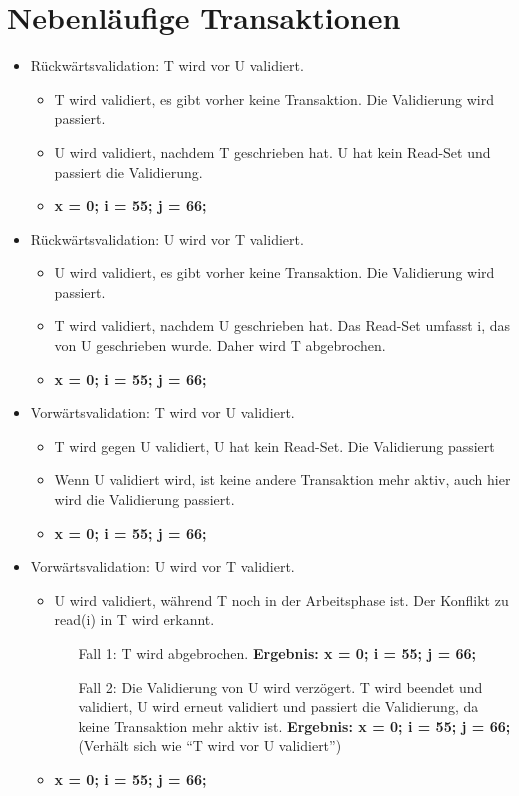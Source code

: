 \documentclass[a4paper,9pt]{article}
\begin{document}
\section{Nebenl\"aufige Transaktionen}

\begin{itemize}
\item R\"uckw\"artsvalidation: T wird vor U validiert.
	\begin{itemize}
	\item T wird validiert, es gibt vorher keine Transaktion. Die Validierung wird passiert.
	\item U wird validiert, nachdem T geschrieben hat. U hat kein Read-Set und passiert die Validierung.
	\item \textbf{x = 0; i = 55; j = 66;}
	\end{itemize}
\item R\"uckw\"artsvalidation: U wird vor T validiert.
	\begin{itemize}
	\item U wird validiert, es gibt vorher keine Transaktion. Die Validierung wird passiert.
	\item T wird validiert, nachdem U geschrieben hat. Das Read-Set umfasst i, das von U geschrieben wurde. Daher wird T abgebrochen.
	\item \textbf{x = 0; i = 55; j = 66;}
	\end{itemize}
\item Vorw\"artsvalidation: T wird vor U validiert.
	\begin{itemize}
	\item T wird gegen U validiert, U hat kein Read-Set. Die Validierung passiert
	\item Wenn U validiert wird, ist keine andere Transaktion mehr aktiv, auch hier wird die Validierung passiert.
	\item \textbf{x = 0; i = 55; j = 66;}
	\end{itemize}
\item Vorw\"artsvalidation: U wird vor T validiert.
	\begin{itemize}
	\item U wird validiert, w\"ahrend T noch in der Arbeitsphase ist. Der Konflikt zu read(i) in T wird erkannt.
		\begin{itemize}
		\item [Fall 1:] T wird abgebrochen. \textbf{Ergebnis: x = 0; i = 55; j = 66;}
		\item [Fall 2:] Die Validierung von U wird verz\"ogert. T wird beendet und validiert, U wird erneut validiert und passiert die Validierung, da keine Transaktion mehr aktiv ist. \textbf{Ergebnis: x = 0; i = 55; j = 66;} (Verh\"alt sich wie "`T wird vor U validiert"')
		\end{itemize}
	\item \textbf{x = 0; i = 55; j = 66;}
	\end{itemize}
\end{itemize}
\end{document}
